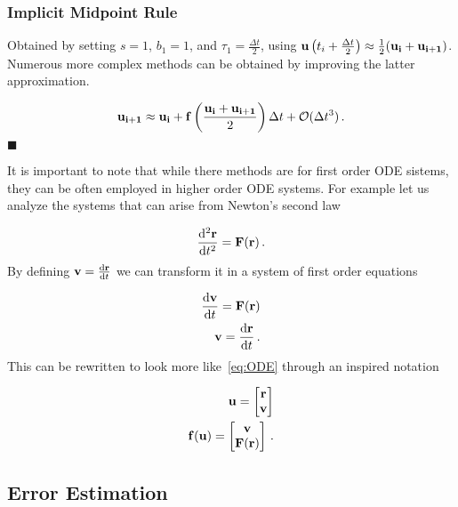 \documentclass[12pt, class=report, crop=false]{standalone}
\begin{document}
\subsubsection{Implicit Midpoint Rule}

Obtained by setting \(s=1\), \(b_1=1\), and \(\tau_1 = \frac{\Delta t}{2}\), using \(\vb{u}\left(t_i+\frac{\Delta t}{2}\right) \approx \frac{1}{2} (\vb{u_i} + \vb{u_{i+1}})\). Numerous more complex methods can be obtained by improving the latter approximation.

\begin{equation}
  \vb{u_{i+1}} \approx \vb{u_i} + \vb{f}\left(\frac{\vb{u_i} + \vb{u_{i+1}}}{2}\right) \Delta t + \mathcal{O}(\Delta t^3)\,.
\end{equation}
\(\blacksquare\)

It is important to note that while there methods are for first order ODE sistems, they can be often employed in higher order ODE systems. For example let us analyze the systems that can arise from Newton's second law

\begin{equation}
  \dv[2]{\vb{r}}{t} = \vb{F}(\vb{r})\,.
\end{equation}
By defining \(\vb{v} = \dv{\vb{r}}{t}\) we can transform it in a system of first order equations

\begin{subequations}
  \begin{align}
    \dv{\vb{v}}{t} = \vb{F}(\vb{r})\\
    \vb{v} = \dv{\vb{r}}{t}\,.
  \end{align}
\end{subequations}
This can be rewritten to look more like~\cref{eq:ODE} through an inspired notation

\begin{subequations}
  \begin{align}
    \vb{u} =
    \begin{bmatrix}
      \vb{r}\\
      \vb{v}
    \end{bmatrix} \\
    \vb{f}(\vb{u}) =
    \begin{bmatrix}
      \vb{v}\\
      \vb{F}(\vb{r})
    \end{bmatrix}\,.
  \end{align}
\end{subequations}

\subsection{Error Estimation}
\end{document}
